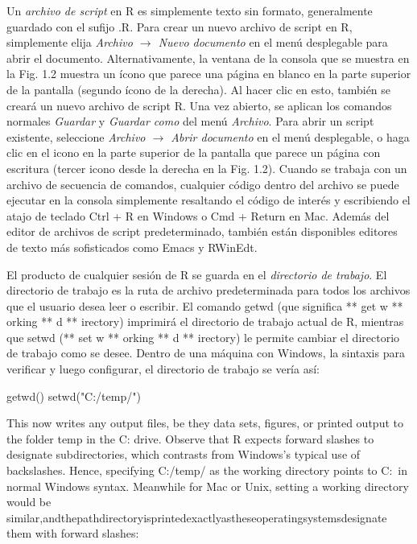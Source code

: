 \documentclass[
]{book}
\newenvironment{Shaded}{\begin{snugshade}}{\end{snugshade}}
\newcommand{\FunctionTok}[1]{\textcolor[rgb]{0.00,0.00,0.00}{#1}}
\newcommand{\NormalTok}[1]{#1}
\newcommand{\StringTok}[1]{\textcolor[rgb]{0.31,0.60,0.02}{#1}}
\begin{document}
Un \emph{archivo de script} en R es simplemente texto sin formato, generalmente guardado con el sufijo .R. Para crear un nuevo archivo de script en R, simplemente elija \emph{Archivo \(\rightarrow\) Nuevo documento} en el menú desplegable para abrir el documento. Alternativamente, la ventana de la consola que se muestra en la Fig. 1.2 muestra un ícono que parece una página en blanco en la parte superior de la pantalla (segundo ícono de la derecha). Al hacer clic en esto, también se creará un nuevo archivo de script R. Una vez abierto, se aplican los comandos normales \emph{Guardar} y \emph{Guardar como} del menú \emph{Archivo}. Para abrir un script existente, seleccione \emph{Archivo \(\rightarrow\) Abrir documento} en el menú desplegable, o haga clic en el icono en la parte superior de la pantalla que parece un página con escritura (tercer icono desde la derecha en la Fig. 1.2). Cuando se trabaja con un archivo de secuencia de comandos, cualquier código dentro del archivo se puede ejecutar en la consola simplemente resaltando el código de interés y escribiendo el atajo de teclado Ctrl + R en Windows o Cmd + Return en Mac. Además del editor de archivos de script predeterminado, también están disponibles editores de texto más sofisticados como Emacs y RWinEdt.

El producto de cualquier sesión de R se guarda en el \emph{directorio de trabajo}. El directorio de trabajo es la ruta de archivo predeterminada para todos los archivos que el usuario desea leer o escribir. El comando getwd (que significa ** get w ** orking ** d ** irectory) imprimirá el directorio de trabajo actual de R, mientras que setwd (** set w ** orking ** d ** irectory) le permite cambiar el directorio de trabajo como se desee. Dentro de una máquina con Windows, la sintaxis para verificar y luego configurar, el directorio de trabajo se vería así:

\begin{Shaded}
\begin{Highlighting}[]
\FunctionTok{getwd}\NormalTok{() }
\FunctionTok{setwd}\NormalTok{(}\StringTok{"C:/temp/"}\NormalTok{)}
\end{Highlighting}
\end{Shaded}

This now writes any output files, be they data sets, figures, or printed output to the folder temp in the C: drive. Observe that R expects forward slashes to designate subdirectories, which contrasts from Windows's typical use of backslashes. Hence, specifying C:/temp/ as the working directory points to C:\temp~in normal Windows syntax. Meanwhile for Mac or Unix, setting a working directory would be similar,andthepathdirectoryisprintedexactlyastheseoperatingsystemsdesignate them with forward slashes:
\end{document}
